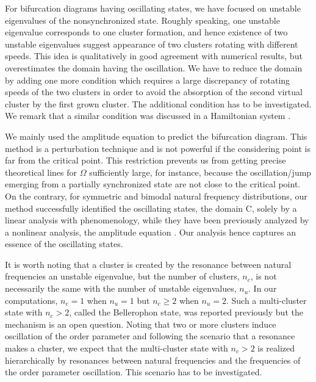 For bifurcation diagrams having oscillating states,
we have focused on unstable eigenvalues of the nonsynchronized state.
Roughly speaking, one unstable eigenvalue corresponds to one cluster formation,
and hence existence of two unstable eigenvalues suggest
appearance of two clusters rotating with different speeds.
This idea is qualitatively in good agreement with numerical results,
but overestimates the domain having the oscillation.
We have to reduce the domain by adding one more condition
which requires a large discrepancy of rotating speeds of the two clusters
in order to avoid the absorption of the second virtual cluster
by the first grown cluster.
The additional condition has to be investigated.
We remark that a similar condition was discussed in a Hamiltonian system
\cite{barre-yamaguchi-09}.

  We mainly used the amplitude equation to predict the bifurcation diagram.
  This method is a perturbation technique
  and is not powerful if the considering point is far from the critical point.
  This restriction prevents us from getting precise theoretical lines
  for $\Omega$ sufficiently large, for instance, because the oscillation/jump
  emerging from a partially synchronized state are not close to the critical point.
  On the contrary, for symmetric and bimodal natural frequency distributions,
  our method successfully identified the oscillating states,
  the domain C, solely by a linear analysis with phenomenology,
  while they have been previously analyzed by a nonlinear analysis,
  the amplitude equation \cite{crawford1994}.
  Our analysis hence captures an essence of the oscillating states.

It is worth noting that a cluster is created by
the resonance between natural frequencies an unstable eigenvalue,
but the number of clusters, $n_{c}$,
is not necessarily the same with the number of unstable eigenvalues, $n_{u}$.
In our computations, $n_{c}=1$ when $n_{u}=1$
but $n_{c}\geq 2$ when $n_{u}=2$.
Such a multi-cluster state with $n_{c}>2$, called the Bellerophon state, 
was reported previously \cite{bi2016,li2019}
but the mechanism is an open question.
Noting that two or more clusters induce oscillation of the order parameter
and following the scenario that a resonance makes a cluster,
we expect that the multi-cluster state with $n_{c}>2$
is realized hierarchically by resonances between natural frequencies
and the frequencies of the order parameter oscillation.
This scenario has to be investigated.


